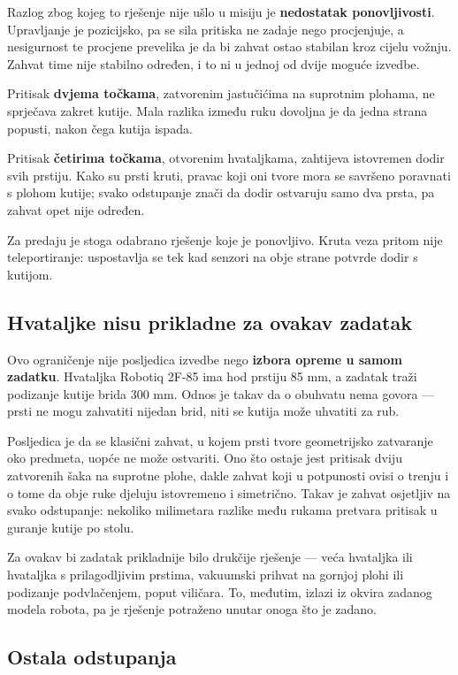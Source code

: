 \documentclass[12pt,a4paper]{article}
\begin{document}
Razlog zbog kojeg to rješenje nije ušlo u misiju je \textbf{nedostatak ponovljivosti}. Upravljanje
je pozicijsko, pa se sila pritiska ne zadaje nego procjenjuje, a nesigurnost te procjene prevelika
je da bi zahvat ostao stabilan kroz cijelu vožnju. Zahvat time nije stabilno određen, i to ni u
jednoj od dvije moguće izvedbe.

Pritisak \textbf{dvjema točkama}, zatvorenim jastučićima na suprotnim plohama, ne sprječava zakret
kutije. Mala razlika između ruku dovoljna je da jedna strana popusti, nakon čega kutija ispada.

Pritisak \textbf{četirima točkama}, otvorenim hvataljkama, zahtijeva istovremen dodir svih
prstiju. Kako su prsti kruti, pravac koji oni tvore mora se savršeno poravnati s plohom kutije;
svako odstupanje znači da dodir ostvaruju samo dva prsta, pa zahvat opet nije određen.

Za predaju je stoga odabrano rješenje koje je ponovljivo. Kruta veza pritom nije teleportiranje:
uspostavlja se tek kad senzori na obje strane potvrde dodir s kutijom.

\subsection{Hvataljke nisu prikladne za ovakav zadatak}

Ovo ograničenje nije posljedica izvedbe nego \textbf{izbora opreme u samom zadatku}. Hvataljka
Robotiq 2F-85 ima hod prstiju 85 mm, a zadatak traži podizanje kutije brida 300 mm. Odnos je
takav da o obuhvatu nema govora --- prsti ne mogu zahvatiti nijedan brid, niti se kutija može
uhvatiti za rub.

Posljedica je da se klasični zahvat, u kojem prsti tvore geometrijsko zatvaranje oko predmeta,
uopće ne može ostvariti. Ono što ostaje jest pritisak dviju zatvorenih šaka na suprotne plohe,
dakle zahvat koji u potpunosti ovisi o trenju i o tome da obje ruke djeluju istovremeno i
simetrično. Takav je zahvat osjetljiv na svako odstupanje: nekoliko milimetara razlike među
rukama pretvara pritisak u guranje kutije po stolu.

Za ovakav bi zadatak prikladnije bilo drukčije rješenje --- veća hvataljka ili hvataljka s
prilagodljivim prstima, vakuumski prihvat na gornjoj plohi ili podizanje podvlačenjem, poput
viličara. To, međutim, izlazi iz okvira zadanog modela robota, pa je rješenje potraženo unutar
onoga što je zadano.

\subsection{Ostala odstupanja}
\end{document}
